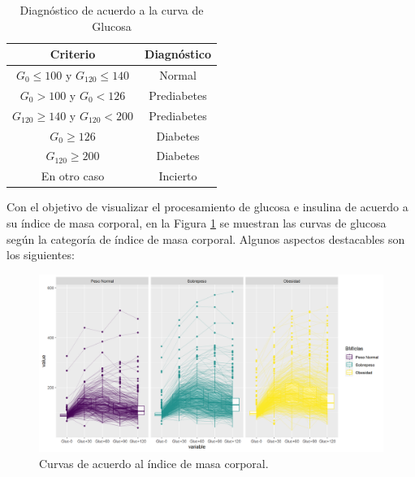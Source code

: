\begin{table}[H]
\centering
\begin{tabular}{||c|c||}
\hline\hline
\textbf{Criterio}                       & \textbf{Diagnóstico} \\ \hline\hline
$G_0 \leq100$ y $G_{120} \leq 140$   & Normal               \\ \hline
$G_{0} > 100$ y $G_{0} < 126$  & Prediabetes          \\ \hline
$G_{120} \geq 140$ y $G_{120} < 200$ & Prediabetes          \\ \hline
$G_0 \geq 126$                     & Diabetes             \\ \hline
$G_{120} \geq 200$                  & Diabetes             \\ \hline
En otro caso                            & Incierto              \\ \hline\hline
\end{tabular}
\caption{Diagnóstico de acuerdo a la curva de Glucosa}
\label{tab:diagnostico}
\end{table}

Con el objetivo de visualizar el procesamiento de glucosa e insulina de acuerdo a su índice de masa corporal, en la Figura \ref{fig:CurvasGluIBM} se muestran las curvas de glucosa según la categoría de índice de masa corporal. Algunos aspectos destacables son los siguientes: 

\begin{figure}[H]
    \centering
    \includegraphics[width = 0.9 \textwidth]{Imagenes/gluCurvasBMI.png}
    \caption{Curvas de acuerdo al índice de masa corporal.}
    \label{fig:CurvasGluIBM}
\end{figure}


